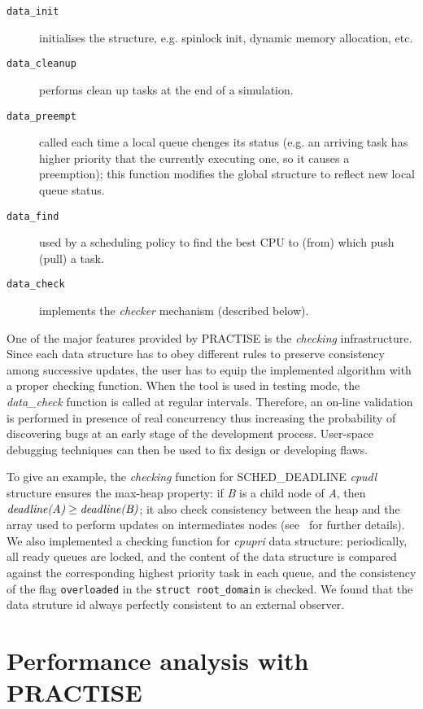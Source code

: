 \begin{description}
\item[\texttt{data\_init}] initialises the structure, e.g. spinlock init, dynamic memory allocation, etc.
\item[\texttt{data\_cleanup}] performs clean up tasks at the end of a simulation.
\item[\texttt{data\_preempt}] called each time a local queue chenges its status (e.g. an arriving task
has higher priority that the currently executing one, so it causes a preemption); this function modifies 
the global structure to reflect new local queue status.
\item[\texttt{data\_find}] used by a scheduling policy to find the best CPU to (from) which push (pull) a
task.
\item[\texttt{data\_check}] implements the \emph{checker} mechanism (described below).
\end{description}

One of the major features provided by PRACTISE is the \emph{checking} infrastructure. Since each data
structure has to obey different rules to preserve consistency among successive updates, the user has to
equip the implemented algorithm with a proper checking function. When the tool is used in testing mode,
the \emph{data\_check} function is called at regular intervals. Therefore, an on-line validation is
performed in presence of real concurrency thus increasing the probability of discovering bugs at an
early stage of the development process. User-space debugging techniques can then be used to fix design
or developing flaws.

To give an example, the \emph{checking} function for SCHED\_DEADLINE \emph{cpudl} structure ensures 
the max-heap property: if \emph{B} is a child node of \emph{A}, then \( \emph{deadline(A)} \geq 
\emph{deadline(B)} \); it also check consistency between the heap and the array used to perform
updates on intermediates nodes (see~\cite{lelli2011efficient} for
further details). We also implemented a checking function for \emph{cpupri} data structure:
periodically, all ready queues are locked, and the content of the data structure is compared against
the corresponding highest priority task in each queue, and the consistency of the flag \texttt{overloaded}
in the \texttt{struct root\_domain} is checked. We found that the data struture id always perfectly
consistent to an external observer.

\section{Performance analysis with PRACTISE\label{PRACTISE_perf_anal}}

